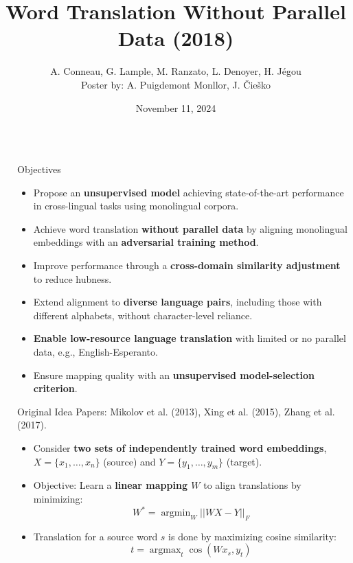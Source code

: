 \documentclass[final]{beamer}
\title[Word Translation Without Parallel Data]{\textcolor{ngreen}{Word Translation Without Parallel Data (2018)}}
\author[ ]{\textcolor{secondarycolor}{A. Conneau, G. Lample, M. Ranzato, L. Denoyer, H. Jégou\\Poster by: A. Puigdemont Monllor, J. Čieško}}
\institute[FI MU]{\textcolor{secondarycolor}{PA164: Machine Learning and NLP, Faculty of Informatics, Masaryk University, November 11, 2024}}
\date{\textcolor{primarycolor}{November 11, 2024}}
\newlength{\sepwid}
\newlength{\onecolwid}
\DeclareMathOperator*{\argmax}{argmax}
\DeclareMathOperator*{\argmin}{argmin}
\begin{document}
\setlength{\belowcaptionskip}{2ex}
\setlength\belowdisplayshortskip{2ex}

\begin{frame}[t]

\begin{columns}[t]

\begin{column}{\sepwid}\end{column}

\begin{column}{\onecolwid}


\begin{alertblock}{Objectives} 
    \begin{itemize}
        \item Propose an \textbf{unsupervised model} achieving state-of-the-art performance in cross-lingual tasks using monolingual corpora.
        \item Achieve word translation \textbf{without parallel data} by aligning monolingual embeddings with an \textbf{adversarial training method}.
        \item Improve performance through a \textbf{cross-domain similarity adjustment} to reduce hubness.
        \item Extend alignment to \textbf{diverse language pairs}, including those with different alphabets, without character-level reliance.
        \item \textbf{Enable low-resource language translation} with limited or no parallel data, e.g., English-Esperanto.
        \item Ensure mapping quality with an \textbf{unsupervised model-selection criterion}.
    \end{itemize}
\end{alertblock}


\begin{block}{Original Idea}
    Papers: Mikolov et al. (2013), Xing et al. (2015), Zhang et al. (2017).
    \begin{itemize}
        \item Consider \textbf{two sets of independently trained word embeddings}, \( X = \{x_1, \dots, x_n\} \) (source) and \( Y = \{y_1, \dots, y_m\}\) (target).
        \item Objective: Learn a \textbf{linear mapping \(W\)} to align translations by minimizing:
        \[
            W^* = \argmin_{W} || W X - Y ||_F
        \]
        \item Translation for a source word \(s\) is done by maximizing cosine similarity:
        \[
            t = \argmax_{t} \cos(W x_s, y_t)
        \]
    \end{itemize}
\end{block}



\end{column}
\end{columns}
\end{frame}
\end{document}
